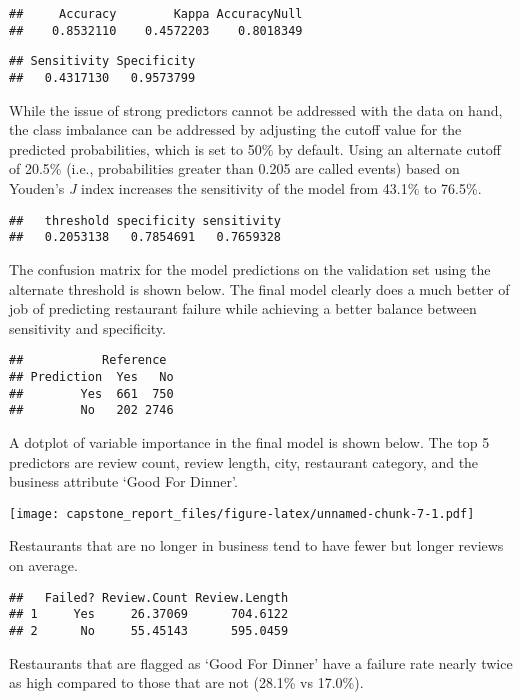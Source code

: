 \documentclass[]{article}
\begin{document}
\begin{verbatim}
##     Accuracy        Kappa AccuracyNull 
##    0.8532110    0.4572203    0.8018349
\end{verbatim}

\begin{verbatim}
## Sensitivity Specificity 
##   0.4317130   0.9573799
\end{verbatim}

While the issue of strong predictors cannot be addressed with the data
on hand, the class imbalance can be addressed by adjusting the cutoff
value for the predicted probabilities, which is set to 50\% by default.
Using an alternate cutoff of 20.5\% (i.e., probabilities greater than
0.205 are called events) based on Youden's \emph{J} index increases the
sensitivity of the model from 43.1\% to 76.5\%.

\begin{verbatim}
##   threshold specificity sensitivity 
##   0.2053138   0.7854691   0.7659328
\end{verbatim}

The confusion matrix for the model predictions on the validation set
using the alternate threshold is shown below. The final model clearly
does a much better of job of predicting restaurant failure while
achieving a better balance between sensitivity and specificity.

\begin{verbatim}
##           Reference
## Prediction  Yes   No
##        Yes  661  750
##        No   202 2746
\end{verbatim}

A dotplot of variable importance in the final model is shown below. The
top 5 predictors are review count, review length, city, restaurant
category, and the business attribute `Good For Dinner'.

\texttt{[image: capstone\_report\_files/figure-latex/unnamed-chunk-7-1.pdf]}

Restaurants that are no longer in business tend to have fewer but longer
reviews on average.

\begin{verbatim}
##   Failed? Review.Count Review.Length
## 1     Yes     26.37069      704.6122
## 2      No     55.45143      595.0459
\end{verbatim}

Restaurants that are flagged as `Good For Dinner' have a failure rate
nearly twice as high compared to those that are not (28.1\% vs 17.0\%).
\end{document}
